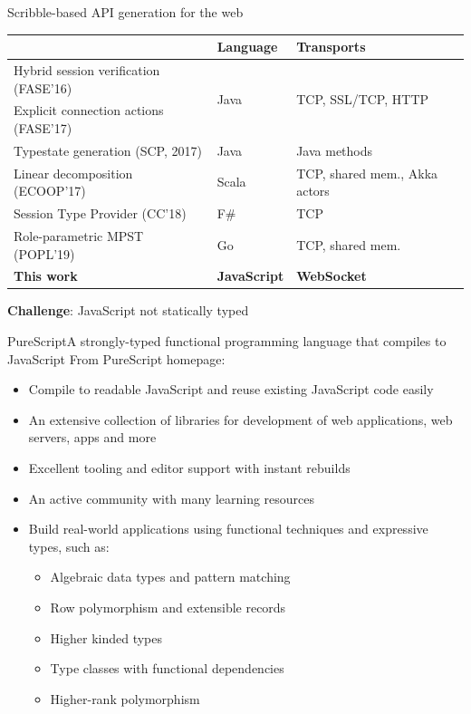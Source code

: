\documentclass[aspectratio=1610]{beamer}
\begin{document}
\begin{frame}{Scribble-based API generation for the web}
  \begin{table}
  \begin{tabular}{lll}
    \toprule
    & Language & Transports\\
    \midrule
    Hybrid session verification (FASE'16)  & \multirow{2}{*}{Java} &\multirow {2}{*}{\small TCP, SSL/TCP, HTTP}\\
    Explicit connection actions (FASE'17)  &      &\\
    Typestate generation (SCP, 2017)       & Java &\small Java methods\\
    Linear decomposition (ECOOP'17)        & Scala&\small TCP, shared mem., Akka actors\\
    Session Type Provider (CC'18)          & F\#  &\small TCP\\
    Role-parametric MPST (POPL'19)         & Go   &\small TCP, shared mem.\\
    \rowcolor{yellow!10} \textbf{This work}& \textbf{JavaScript} &\small \textbf{WebSocket} \\
    \bottomrule
  \end{tabular}
  \end{table}

  \textbf{Challenge}: JavaScript not statically typed
\end{frame}

\begin{frame}{PureScript}{A strongly-typed functional programming language that compiles to JavaScript}
  From PureScript homepage:
  \begin{itemize}
    \item \alert<2>{Compile to readable JavaScript} and reuse existing JavaScript code easily
    \item An extensive collection of libraries for development of web applications, web servers, apps and more
    \item Excellent tooling and editor support with instant rebuilds
    \item An active community with many learning resources
    \item Build real-world applications using functional techniques and expressive types, such as:
      \begin{itemize}
        \item Algebraic data types and pattern matching
        \item Row polymorphism and extensible records
        \item Higher kinded types
        \item \alert<2>{Type classes with functional dependencies}
        \item Higher-rank polymorphism
      \end{itemize}
  \end{itemize}
\end{frame}
\end{document}
